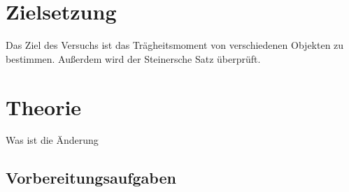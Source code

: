 \section{Zielsetzung}
\label{sec:Zielsetzung}
Das Ziel des Versuchs ist das Trägheitsmoment von verschiedenen Objekten zu bestimmen. Außerdem wird der Steinersche Satz überprüft.
\section{Theorie}
\label{sec:Theorie}
Was ist die Änderung
\subsection{Vorbereitungsaufgaben}
\label{sec:Vorbereitungsaufgaben}
